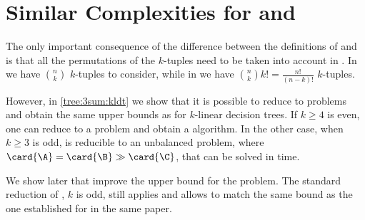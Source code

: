 \section{Similar Complexities for \kSUM and \kLDT}

The only important consequence of the difference between the definitions of
\kSUM and \kLDT is that all the permutations of the $k$-tuples need to be taken
into account in \kLDT. In \kSUM we have $\binom{n}{k}$ $k$-tuples to consider,
while in \kLDT we have $\binom{n}{k} k! = \frac{n!}{(n-k)!}$ $k$-tuples.

However, in \ref{tree:3sum:kldt} we show that it is possible to reduce \kLDT to
\kSUM problems and obtain the same upper bounds as \kSUM for $k$-linear
decision trees. If $k \ge 4$ is even, one can reduce \kLDT to a \twoSUM problem
and obtain a  algorithm. In the other case, when
$k \ge 3$ is odd, \kLDT is reducible to an unbalanced \threeSUM problem, where
$\card{\A} = \card{\B} \gg \card{\C}$, that can be solved in
 time.

We show later that \citet*{gronlund:2014} improve the upper bound for the
\threeSUM problem. The standard reduction of \kLDT, $k$ is odd, still applies
and allows to match the same 
bound as the one established for \threeSUM in the same paper.

